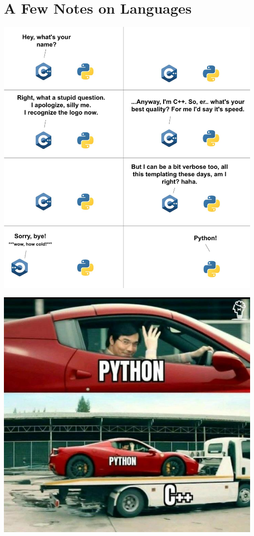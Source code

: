 \documentclass[aspectratio=169, 14pt]{beamer}
\begin{document}
\section{\textcolor{darkmidnightblue}{A Few Notes on Languages}}

\begin{frame}
    \begin{center}
        \includegraphics[height=.95\paperheight]{week0/py-c++}
    \end{center}
\end{frame}

\begin{frame}
    \begin{center}
        \includegraphics[height=.95\paperheight]{week0/py}
    \end{center}
\end{frame}
\end{document}
